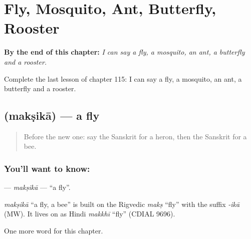 
\chapter{Fly, Mosquito, Ant, Butterfly, Rooster}
\label{ch:sa-fly-mosquito-ant-butterfly-rooster}

\begin{chapteropening}
\textbf{By the end of this chapter:} \emph{I can say a fly, a mosquito, an ant, a butterfly and a rooster.}

Complete the last lesson of chapter 115: I can say a fly, a mosquito, an ant, a butterfly and a rooster.
\end{chapteropening}

\section[\texorpdfstring{\sk{मक्षिका} (makṣikā)}{मक्षिका (makṣikā)}]{ (makṣikā) — a fly}

\label{lesson:SA-C115-maksika}



\begin{quote}
Before the new one: say the Sanskrit for a heron, then the Sanskrit for a bee.
\end{quote}

\subsection*{You'll want to know: }
\textbf{} — \emph{makṣikā} — \textquotedblleft{}a fly\textquotedblright{}.

\begin{cousinweb}
\emph{makṣikā} \textquotedblleft{}a fly, a bee\textquotedblright{} is built on the Rigvedic \emph{makṣ} \textquotedblleft{}fly\textquotedblright{} with the suffix \emph{-ikā} (MW). It lives on as Hindi \emph{makkhī} \textquotedblleft{}fly\textquotedblright{} (CDIAL 9696).
\end{cousinweb}

\begin{grammarlens}[title={What you've built}]
One more word for this chapter.
\end{grammarlens}

